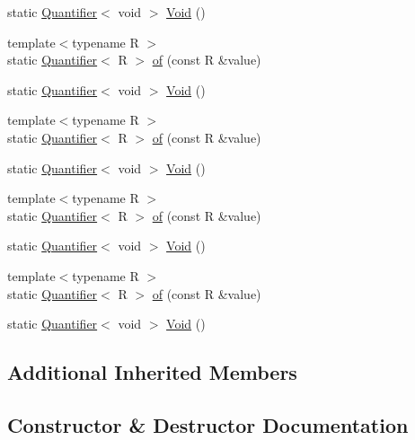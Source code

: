 \begin{DoxyCompactItemize}
\item 
static \mbox{\hyperlink{structfakeit_1_1Quantifier}{Quantifier}}$<$ void $>$ \mbox{\hyperlink{structfakeit_1_1Times_ab473a1b456a5d360aff2fc5c4749ecae}{Void}} ()
\item 
{\footnotesize template$<$typename R $>$ }\\static \mbox{\hyperlink{structfakeit_1_1Quantifier}{Quantifier}}$<$ R $>$ \mbox{\hyperlink{structfakeit_1_1Times_a9c53fb71e7c6d2e295a77909bd971193}{of}} (const R \&value)
\item 
static \mbox{\hyperlink{structfakeit_1_1Quantifier}{Quantifier}}$<$ void $>$ \mbox{\hyperlink{structfakeit_1_1Times_ab473a1b456a5d360aff2fc5c4749ecae}{Void}} ()
\item 
{\footnotesize template$<$typename R $>$ }\\static \mbox{\hyperlink{structfakeit_1_1Quantifier}{Quantifier}}$<$ R $>$ \mbox{\hyperlink{structfakeit_1_1Times_a9c53fb71e7c6d2e295a77909bd971193}{of}} (const R \&value)
\item 
static \mbox{\hyperlink{structfakeit_1_1Quantifier}{Quantifier}}$<$ void $>$ \mbox{\hyperlink{structfakeit_1_1Times_ab473a1b456a5d360aff2fc5c4749ecae}{Void}} ()
\item 
{\footnotesize template$<$typename R $>$ }\\static \mbox{\hyperlink{structfakeit_1_1Quantifier}{Quantifier}}$<$ R $>$ \mbox{\hyperlink{structfakeit_1_1Times_a9c53fb71e7c6d2e295a77909bd971193}{of}} (const R \&value)
\item 
static \mbox{\hyperlink{structfakeit_1_1Quantifier}{Quantifier}}$<$ void $>$ \mbox{\hyperlink{structfakeit_1_1Times_ab473a1b456a5d360aff2fc5c4749ecae}{Void}} ()
\item 
{\footnotesize template$<$typename R $>$ }\\static \mbox{\hyperlink{structfakeit_1_1Quantifier}{Quantifier}}$<$ R $>$ \mbox{\hyperlink{structfakeit_1_1Times_a9c53fb71e7c6d2e295a77909bd971193}{of}} (const R \&value)
\item 
static \mbox{\hyperlink{structfakeit_1_1Quantifier}{Quantifier}}$<$ void $>$ \mbox{\hyperlink{structfakeit_1_1Times_ab473a1b456a5d360aff2fc5c4749ecae}{Void}} ()
\end{DoxyCompactItemize}
\subsection*{Additional Inherited Members}


\subsection{Constructor \& Destructor Documentation}
\mbox{\label{structfakeit_1_1Times_a8b8f13261b992a10b63594af75c6f159}} 

